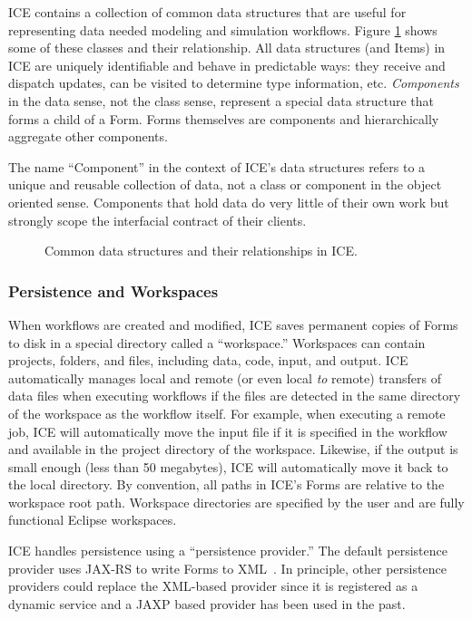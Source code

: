 ICE contains a collection of common data structures that are useful for
representing data needed modeling and simulation workflows. Figure
\ref{data-arch} shows some of these classes and their relationship. All data
structures (and Items) in ICE are uniquely identifiable and behave in
predictable ways: they receive and dispatch updates, can be visited to determine
type information, etc. \textit{Components} in the data sense, not the class
sense, represent a special data structure that forms a child of a Form. Forms
themselves are components and hierarchically aggregate other components.

The name ``Component'' in the context of ICE's data structures refers to a
unique and reusable collection of data, not a class or component in the object
oriented sense. Components that hold data do very little of their own work but
strongly scope the interfacial contract of their clients.

\begin{figure}[htbp]
\centering
{}
\caption{Common data structures and their relationships in ICE.}
\label{data-arch}
\end{figure}

\subsubsection{Persistence and
Workspaces}\label{persistence-and-workspaces}

When workflows are created and modified, ICE saves permanent copies of 
Forms to disk in a special directory called a ``workspace.''
Workspaces can contain projects, folders, and files, including data,
code, input, and output. ICE automatically manages local and remote (or
even local \emph{to} remote) transfers of data files when executing
workflows if the files are detected in the same directory of the
workspace as the workflow itself. For example, when executing a remote
job, ICE will automatically move the input file if it is specified in
the workflow and available in the project directory of the workspace.
Likewise, if the output is small enough (less than 50 megabytes), ICE will
automatically move it back to the local directory. By convention, all paths in
ICE's Forms are relative to the workspace root path. Workspace directories are
specified by the user and are fully functional Eclipse workspaces.

ICE handles persistence using a ``persistence provider.'' The
default persistence provider uses JAX-RS to write Forms to 
XML~\cite{burke_restful_2010}. In principle, other persistence providers 
could replace the XML-based provider since it is registered as a dynamic 
service and a JAXP based provider has been used in the past.

